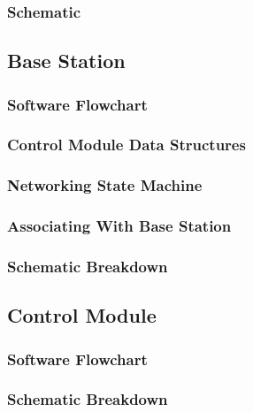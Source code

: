 \subsubsection{Schematic}

\subsection{Base Station}

\subsubsection{Software Flowchart}


\subsubsection{Control Module Data Structures}

\subsubsection{Networking State Machine}

\subsubsection{Associating With Base Station}

\subsubsection{Schematic Breakdown}

\subsection{Control Module}

\subsubsection{Software Flowchart}

\subsubsection{Schematic Breakdown}


